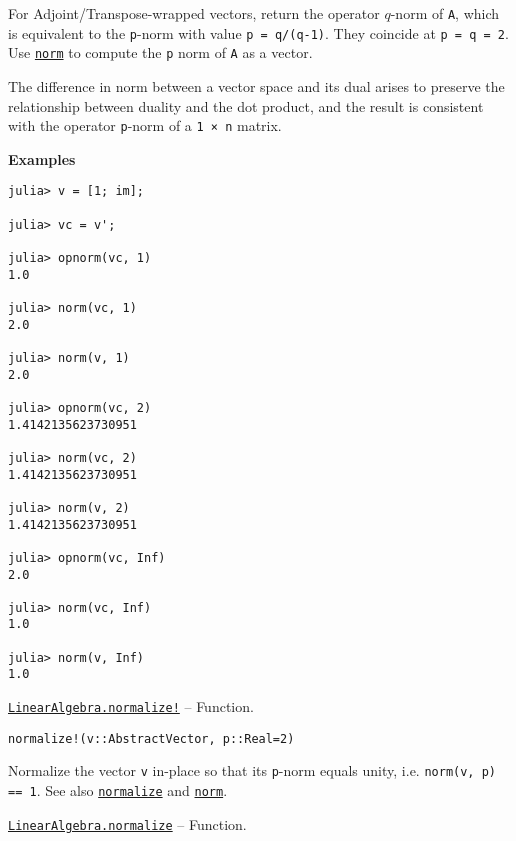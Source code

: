 \begin{adjustwidth}{2em}{0pt}
For Adjoint/Transpose-wrapped vectors, return the operator \(q\)-norm of \texttt{A}, which is equivalent to the \texttt{p}-norm with value \texttt{p = q/(q-1)}. They coincide at \texttt{p = q = 2}. Use \hyperlink{898926013064269707}{\texttt{norm}} to compute the \texttt{p} norm of \texttt{A} as a vector.

The difference in norm between a vector space and its dual arises to preserve the relationship between duality and the dot product, and the result is consistent with the operator \texttt{p}-norm of a \texttt{1 × n} matrix.

\textbf{Examples}


\begin{verbatim}
julia> v = [1; im];

julia> vc = v';

julia> opnorm(vc, 1)
1.0

julia> norm(vc, 1)
2.0

julia> norm(v, 1)
2.0

julia> opnorm(vc, 2)
1.4142135623730951

julia> norm(vc, 2)
1.4142135623730951

julia> norm(v, 2)
1.4142135623730951

julia> opnorm(vc, Inf)
2.0

julia> norm(vc, Inf)
1.0

julia> norm(v, Inf)
1.0
\end{verbatim}



\end{adjustwidth}
\hypertarget{7806117778219468080}{} 
\hyperlink{7806117778219468080}{\texttt{LinearAlgebra.normalize!}}  -- {Function.}

\begin{adjustwidth}{2em}{0pt}


\begin{verbatim}
normalize!(v::AbstractVector, p::Real=2)
\end{verbatim}

Normalize the vector \texttt{v} in-place so that its \texttt{p}-norm equals unity, i.e. \texttt{norm(v, p) == 1}. See also \hyperlink{10731692832589480792}{\texttt{normalize}} and \hyperlink{898926013064269707}{\texttt{norm}}.



\end{adjustwidth}
\hypertarget{10731692832589480792}{} 
\hyperlink{10731692832589480792}{\texttt{LinearAlgebra.normalize}}  -- {Function.}

